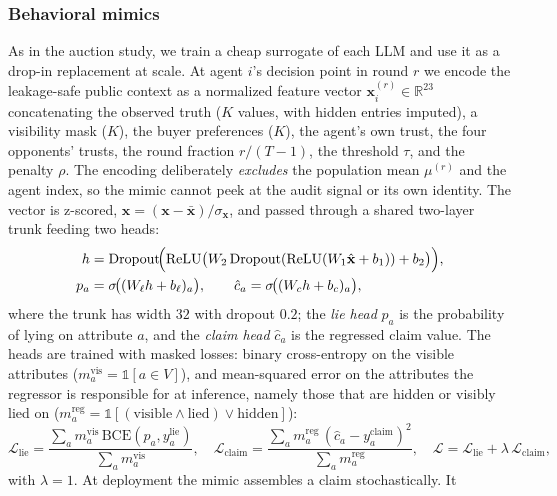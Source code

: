 \subsubsection{Behavioral mimics}
\label{sec:dec-mimics}
As in the auction study, we train a cheap surrogate of each LLM and use it as a
drop-in replacement at scale. At agent $i$'s decision point in round $r$ we
encode the leakage-safe public context as a normalized feature vector
$\mathbf{x}_i^{(r)} \in \mathbb{R}^{23}$ concatenating the observed truth
($K$ values, with hidden entries imputed), a visibility mask ($K$), the buyer
preferences ($K$), the agent's own trust, the four opponents' trusts, the round
fraction $r/(T-1)$, the threshold $\tau$, and the penalty $\rho$. The encoding
deliberately \emph{excludes} the population mean $\mu^{(r)}$ and the agent index,
so the mimic cannot peek at the audit signal or its own identity. The vector is
z-scored, $\hat{\mathbf{x}} = (\mathbf{x} - \bar{\mathbf{x}})/\sigma_{\mathbf{x}}$,
and passed through a shared two-layer trunk feeding two heads:
\begin{align}
h &= \mathrm{Dropout}\!\Bigl(\mathrm{ReLU}\bigl(W_2\,\mathrm{Dropout}(\mathrm{ReLU}(W_1\hat{\mathbf{x}} + b_1)) + b_2\bigr)\Bigr), \label{eq:dec-trunk}\\
p_a &= \sigma\!\bigl((W_\ell h + b_\ell)_a\bigr), \qquad
\hat{c}_a = \sigma\!\bigl((W_c h + b_c)_a\bigr), \label{eq:dec-heads}
\end{align}
where the trunk has width $32$ with dropout $0.2$; the \emph{lie head} $p_a$ is
the probability of lying on attribute $a$, and the \emph{claim head}
$\hat{c}_a$ is the regressed claim value. The heads are trained with masked
losses: binary cross-entropy on the visible attributes
($m^{\mathrm{vis}}_a = \mathbb{1}[a \in V]$), and mean-squared error on the
attributes the regressor is responsible for at inference, namely those that are
hidden or visibly lied on
($m^{\mathrm{reg}}_a = \mathbb{1}[(\text{visible} \wedge \text{lied}) \vee \text{hidden}]$):
\begin{equation}
\mathcal{L}_{\mathrm{lie}} = \frac{\sum_a m^{\mathrm{vis}}_a\,\mathrm{BCE}(p_a, y^{\mathrm{lie}}_a)}{\sum_a m^{\mathrm{vis}}_a},
\quad
\mathcal{L}_{\mathrm{claim}} = \frac{\sum_a m^{\mathrm{reg}}_a\,(\hat{c}_a - y^{\mathrm{claim}}_a)^2}{\sum_a m^{\mathrm{reg}}_a},
\quad
\mathcal{L} = \mathcal{L}_{\mathrm{lie}} + \lambda\,\mathcal{L}_{\mathrm{claim}},
\label{eq:dec-loss}
\end{equation}
with $\lambda = 1$. At deployment the mimic assembles a claim stochastically. It
